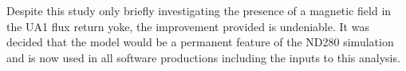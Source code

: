 \newline
\newline
Despite this study only briefly investigating the presence of a magnetic field in the UA1 flux return yoke, the improvement provided is undeniable.  It was decided that the model would be a permanent feature of the ND280 simulation and is now used in all software productions including the inputs to this analysis.
